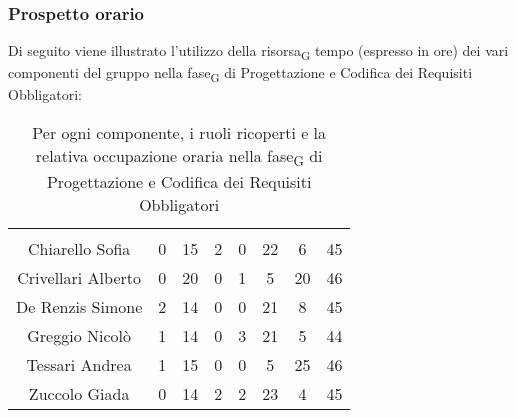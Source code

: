 \subsubsection{Prospetto orario}
Di seguito viene illustrato l'utilizzo della \gls{risorsa}\textsubscript{G} tempo (espresso in ore) dei vari componenti del gruppo nella \gls{fase}\textsubscript{G} di Progettazione e Codifica dei Requisiti Obbligatori:

\begin{table}[H]
	\begin{center}
		\begin{tabular}{c
				!{\color[HTML]{9b240a}\vrule width 1pt}
				cccccc
				!{\color[HTML]{9b240a}\vrule width 1pt}	
				c}
			\rowcolorhead
			 &  &  &  &  &  &  &  \\
			
			Chiarello Sofia & 0 & 15 & 2 & 0 & 22 & 6 & 45\\
			Crivellari Alberto & 0 & 20 & 0 & 1 & 5 & 20 & 46\\
			De Renzis Simone & 2 & 14 & 0 & 0 & 21 & 8 & 45\\
			Greggio Nicolò & 1 & 14 & 0 & 3 & 21 & 5 & 44\\
			Tessari Andrea & 1 & 15 & 0 & 0 & 5 & 25 & 46\\
			Zuccolo Giada & 0 & 14 & 2 & 2 & 23 & 4 & 45\\
		\end{tabular}
		\caption[Occupazione oraria Progettazione e Codifica dei Requisiti Obbligatori]{Per ogni componente, i ruoli ricoperti e la relativa occupazione oraria nella \gls{fase}\textsubscript{G} di Progettazione e Codifica dei Requisiti Obbligatori}
	\end{center}
\end{table}


